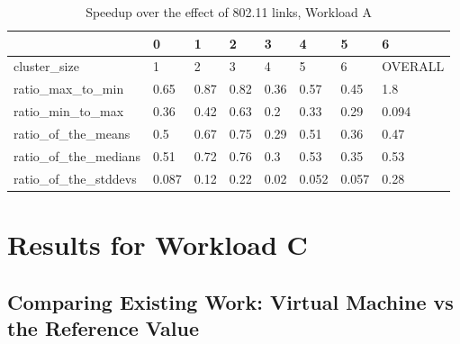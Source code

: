 \begin{table}[H]
\centering
\begin{tabular}{llllllll}
\toprule
{} &     0 &    1 &    2 &    3 &     4 &     5 &        6 \\
\midrule
cluster\_size         &     1 &    2 &    3 &    4 &     5 &     6 &  OVERALL \\
ratio\_max\_to\_min     &  0.65 & 0.87 & 0.82 & 0.36 &  0.57 &  0.45 &      1.8 \\
ratio\_min\_to\_max     &  0.36 & 0.42 & 0.63 &  0.2 &  0.33 &  0.29 &    0.094 \\
ratio\_of\_the\_means   &   0.5 & 0.67 & 0.75 & 0.29 &  0.51 &  0.36 &     0.47 \\
ratio\_of\_the\_medians &  0.51 & 0.72 & 0.76 &  0.3 &  0.53 &  0.35 &     0.53 \\
ratio\_of\_the\_stddevs & 0.087 & 0.12 & 0.22 & 0.02 & 0.052 & 0.057 &     0.28 \\
\bottomrule
\end{tabular}
\caption{Speedup over the effect of 802.11 links, Workload A}
\label{table:wlan_v_eth_a_speedup}
\end{table}





\section{Results for Workload C}
\subsection{Comparing Existing Work: Virtual Machine vs the Reference Value}
